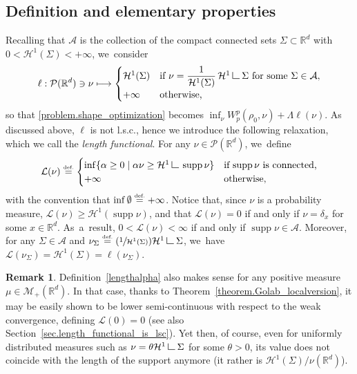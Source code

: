 \documentclass[JEP,XML,SOM,Unicode,NoFloatCountersInSection,published]{cedram}
\newcommand\mto{\mathchoice{\longmapsto}{\mapsto}{\mapsto}{\mapsto}}
\newcommand{\Psfrac}[2]{(\sfrac{#1}{#2})}
\theoremstyle{definition}
\newtheorem{remark}[theorem]{Remark}
\newcommand{\eqdef}{\ensuremath{\stackrel{\mbox{\upshape\tiny def.}}{=}}}
\newcommand\LM[1]{\hbox{\vrule width.5pt \vbox to#1pt{\vfill \hrule width#1pt height.5pt}}}
\newcommand\LL{{\mathchoice {\>\LM7\>}{\>\LM7\>}{\,\LM5\,}{\,\LM{3.35}\,}}}
\newcommand{\mres}{\LL}
\newcommand\cH{\mathcal{H}}
\newcommand{\RR}{\mathbb{R}}
\DeclareMathOperator{\supp}{supp}
\newcommand{\enscond}[2]{\{#1 \mid #2\} }
\begin{document}
\subsection{Definition and elementary properties}\label{subsec.deflength}
Recalling that $\mathcal{A}$ is the collection of the compact connected sets $\Sigma \subset \RR^d$ with $0<\cH^1(\Sigma)<+\infty$, we~consider
\begin{equation}\label{eq:defl}
\ell : \mathcal{P}(\RR^d) \ni \nu \mto
\begin{cases}
\cH^1(\Sigma) & \text{if $\nu=\dfrac{1}{\cH^1(\Sigma)}\,\cH^1\mres \Sigma$ for some $\Sigma \in \mathcal{A}$},\\
+\infty& \text{otherwise,}
\end{cases}
\end{equation}
so that \eqref{problem.shape_optimization} becomes $\inf_\nu W_p^p(\rho_0, \nu) + \Lambda\ell(\nu)$. As discussed above, $\ell$ is not l.s.c., hence we introduce the following relaxation, which we call the \emph{length functional}. For any $\nu \in \mathcal{P}(\RR^d)$, we~define
\begin{equation}
\mathcal{L}(\nu)
\eqdef
\begin{cases}
\inf \enscond{\alpha \ge 0}{\alpha \nu \ge \cH^1\mres \supp \nu} & \mbox{if $\supp \nu$ is connected,}\\
+\infty & \mbox{otherwise,}
\end{cases}\label{lengthalpha}
\end{equation}
with the convention that $\inf \emptyset \eqdef +\infty$. Notice that, since $\nu$ is a probability measure, $\mathcal{L}(\nu)\geq \cH^1(\supp \nu)$, and that $\mathcal{L}(\nu)=0$ if and only if $\nu = \delta_x$ for some $x \in \RR^d$. As~a~result, $0<\mathcal{L}(\nu) < \infty$ if and only if $\supp \nu \in \mathcal{A}$. Moreover, for any $\Sigma \in \mathcal{A}$ and $ \nu_\Sigma\eqdef\Psfrac{1}{\cH^1(\Sigma)} \cH^1\mres \Sigma$, we~have $\mathcal{L}(\nu_\Sigma) = \cH^1(\Sigma)=\ell(\nu_\Sigma)$.

\begin{remark}
Definition~\eqref{lengthalpha} also makes sense for any positive measure $\mu \in \mathcal{M}_+(\RR^d)$. In that case, thanks to Theorem~\ref{theorem.Golab_localversion}, it may be easily shown to be
lower semi-continuous with respect to the weak convergence,
defining $\mathcal{L}(0)=0$ (see also Section~\ref{sec.length_functional_is_lsc}).
Yet then, of course, even for uniformly distributed measures such as $\nu = \theta\cH^1\mres \Sigma$ for some $\theta> 0$, its value does not coincide with the length of the support anymore (it rather is $\cH^1(\Sigma)/\nu(\RR^d)$).
\end{remark}
\end{document}
